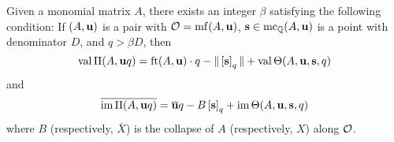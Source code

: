 \documentclass[11pt]{amsart}
\renewcommand{\!}[1]{{\color{red}\text{$\star$\,}#1\,$\star$}}
\newcommand{\ol}[1]{\overline{#1}}
\begin{document}
%
%
%


\begin{corollary}  
\label{uniform value and image: C}
Given a monomial matrix $A$, there exists an integer $\beta$ satisfying the following condition:  If $(A, \mathbf{u})$ is a pair with $\mathcal{O} = \operatorname{mf}(A, \mathbf{u})$, $\mathbf{s} \in \operatorname{mc}_{\mathbb{Q}}(A, \mathbf{u})$ is a point with denominator $D$, and $q>\beta D$, then 
%
\[ \operatorname{val} \Pi(A, \mathbf{u}q) = \operatorname{ft}(A, \mathbf{u}) \cdot q - \| \left[ \mathbf{s} \right]_q \| + \operatorname{val} \Theta(A, \mathbf{u}, \mathbf{s}, q) \] 
%
and 
\[ \ol{\im \IP(A, \vv{u}q)} = \ol{\vv{u}} q - B \tail{\vv{s}}_q + \im \ip(A, \vv{u}, \vv{s}, q) \] 
where $B$ (respectively, $\ol{X}$) is the collapse of $A$  (respectively, $X$) along $\mathcal{O}$.
\end{corollary}
\end{document}
